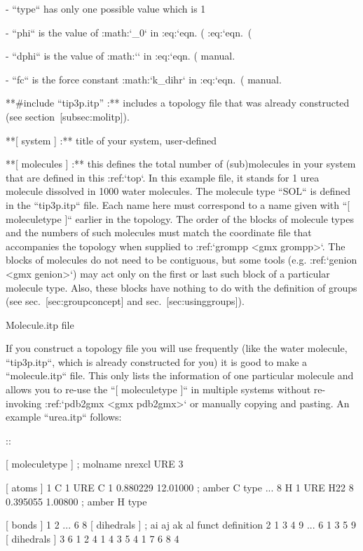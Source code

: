 -  ``type`` has only one possible value which is 1

-  ``phi`` is the value of :math:`\phi_0` in :eq:`eqn. (%
   :eq:`eqn. (%

-  ``dphi`` is the value of :math:`\Delta\phi` in :eq:`eqn. (%
   manual.

-  ``fc`` is the force constant :math:`k_{dihr}` in :eq:`eqn. (%
   manual.

**#include “tip3p.itp” :** includes a topology file that was already
constructed (see section [subsec:molitp]).

 **[ system ] :** title of your system, user-defined

 **[ molecules ] :** this defines the total number of (sub)molecules in your system
that are defined in this :ref:`top`. In this example file, it stands for 1
urea molecule dissolved in 1000 water molecules. The molecule type ``SOL``
is defined in the ``tip3p.itp`` file. Each name here must correspond to a
name given with ``[ moleculetype ]`` earlier in the topology. The order of the blocks of
molecule types and the numbers of such molecules must match the
coordinate file that accompanies the topology when supplied to :ref:`grompp <gmx grompp>`.
The blocks of molecules do not need to be contiguous, but some tools
(e.g. :ref:`genion <gmx genion>`) may act only on the first or last such block of a
particular molecule type. Also, these blocks have nothing to do with the
definition of groups (see sec. [sec:groupconcept] and
sec. [sec:usinggroups]).

Molecule.itp file
~~~~~~~~~~~~~~~~~

If you construct a topology file you will use frequently (like the water
molecule, ``tip3p.itp``, which is already constructed for
you) it is good to make a ``molecule.itp`` file. This only
lists the information of one particular molecule and allows you to
re-use the ``[ moleculetype ]`` in multiple systems without
re-invoking :ref:`pdb2gmx <gmx pdb2gmx>` or manually copying and pasting. An
example ``urea.itp`` follows:

::

    [ moleculetype ]
    ; molname	nrexcl
    URE		3

    [ atoms ]
       1  C  1  URE      C      1     0.880229  12.01000   ; amber C  type
    ...
       8  H  1  URE    H22      8     0.395055   1.00800   ; amber H  type

    [ bonds ]
        1	2
    ...
        6	8
    [ dihedrals ] 
    ;   ai    aj    ak    al funct  definition
         2     1     3     4   9     
    ...
         6     1     3     5   9     
    [ dihedrals ] 
         3     6     1     2   4     
         1     4     3     5   4	 
         1     7     6     8   4

